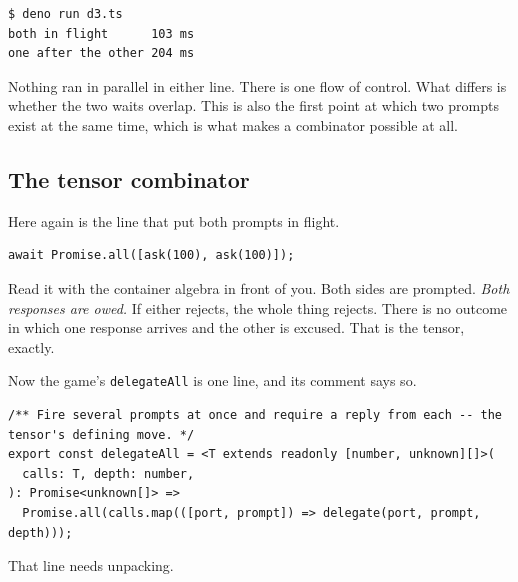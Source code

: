 \documentclass[11pt,a4paper]{article}
\begin{document}
\begin{lstlisting}[language=SH]
$ deno run d3.ts
both in flight      103 ms
one after the other 204 ms
\end{lstlisting}

Nothing ran in parallel in either line. There is one flow of control. What differs is whether the
two waits overlap. This is also the first point at which two prompts exist at the same time, which
is what makes a combinator possible at all.

\subsection{The tensor combinator}

Here again is the line that put both prompts in flight.

\begin{lstlisting}[language=TS]
await Promise.all([ask(100), ask(100)]);
\end{lstlisting}

Read it with the container algebra in front of you. Both sides are prompted. \emph{Both responses are owed.} If either rejects, the whole thing rejects. There is no
outcome in which one response arrives and the other is excused. That is the tensor, exactly.


\newpage

Now the game's \texttt{delegateAll} is one line, and its comment says so.

\begin{lstlisting}[language=TS]
/** Fire several prompts at once and require a reply from each -- the tensor's defining move. */
export const delegateAll = <T extends readonly [number, unknown][]>(
  calls: T, depth: number,
): Promise<unknown[]> =>
  Promise.all(calls.map(([port, prompt]) => delegate(port, prompt, depth)));
\end{lstlisting}

That line needs unpacking.
\end{document}
